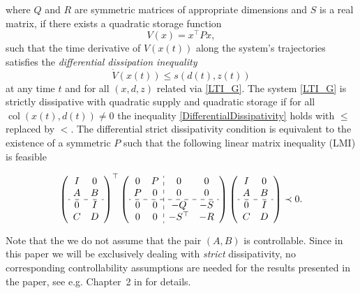 \documentclass[11pt,a4paper,oneside,DIV=12,headings=small]{scrartcl}
\newcommand{\col}{\operatorname{col}}
\theoremstyle{plain}
\begin{document}
where $Q$ and $R$ are symmetric matrices of appropriate dimensions and $S$ is a real matrix, if there exists a quadratic storage function 
\begin{equation}
\label{QuadraticStorage}
V(x)=x^\top P x,
\end{equation}
such that the time derivative of $V(x(t))$ along the system's trajectories satisfies the \emph{differential dissipation inequality}
\begin{equation}
\label{DifferentialDissipativity}
\dot{V}(x(t)) \leq s(d(t),z(t))
\end{equation}
at any time $t$ and for all $(x,d,z)$ related via \eqref{LTI_G}. The system \eqref{LTI_G} is strictly dissipative with quadratic supply and quadratic storage if for all $\col(x(t),d(t))\neq 0$ the inequality \eqref{DifferentialDissipativity} holds with $\leq$ replaced by $<$.   
The differential strict dissipativity condition is equivalent to the existence of a symmetric $P$ such that the following linear matrix inequality (LMI) is feasible

\begin{equation}
\label{DisLMI}
\left(\begin{array}{cc} I & 0 \\ A & B \\ \hdashline 0 & I \\ C & D \end{array}\right)^\top
\left(\begin{array}{cc:cc} 0 & P & 0 & 0 \\ 
P & 0 & 0 & 0 \\ \hdashline 
0 & 0 & -Q & -S \\ 
0 & 0 & -S^\top & -R \end{array}\right)
\left(\begin{array}{cc} I & 0 \\ A & B \\ \hdashline 0 & I \\ C & D \end{array}\right) \prec 0. 
\end{equation}

Note that the we do not assume that the pair $(A,B)$ is controllable. Since in this paper we will be exclusively dealing with \emph{strict} dissipativity, no corresponding controllability assumptions are needed for the results presented in the paper, see e.g. Chapter~2 in \cite{SchererWeiland} for details. 
\end{document}
